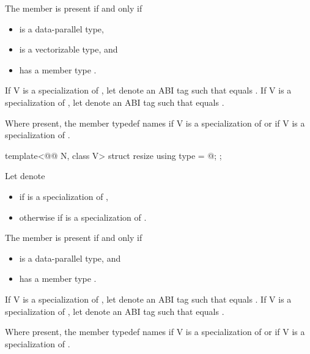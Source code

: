 \begin{itemdescr}
\pnum
The member  is present if and only if
\begin{itemize}
\item {} is a data-parallel type,
\item {} is a vectorizable type, and
\item {} has a member type
  .
\end{itemize}

\pnum
If \tcode V is a specialization of , let  denote
an ABI tag such that  equals
.
If \tcode V is a specialization of , let 
denote an ABI tag such that  equals .

\pnum
Where present, the member typedef  names 
if \tcode V is a specialization of  or
 if \tcode V is a specialization of
.
\end{itemdescr}

\begin{itemdecl}
template<@@ N, class V> struct resize { using type = @\seebelow@; };
\end{itemdecl}

\begin{itemdescr}
\pnum
Let  denote
\begin{itemize}
 \item
    if  is a specialization of
   ,
 \item
   otherwise  if
    is a specialization of .
\end{itemize}

\pnum
The member  is present if and only if
\begin{itemize}
\item {} is a data-parallel type, and
\item {} has a member type .
\end{itemize}

\pnum
If \tcode V is a specialization of , let  denote an
ABI tag such that  equals
.
If \tcode V is a specialization of , let 
denote an ABI tag such that  equals .

\pnum
Where present, the member typedef  names 
if \tcode V is a specialization of  or
 if \tcode V is a specialization of
.
\end{itemdescr}

